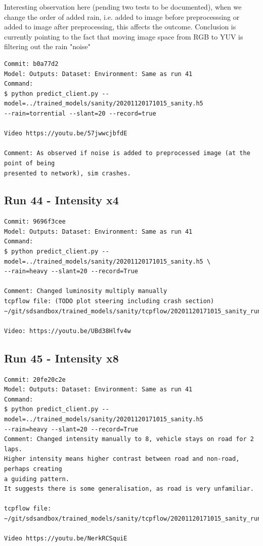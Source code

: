 Interesting observation here (pending two tests to be documented), when we change the order of added rain, i.e. added to image before preprocesssing or added to image after preprocessing, this affects the outcome. Conclusion is currently pointing to the fact that moving image space from RGB to YUV is filtering out the rain "noise"

\label{app_res:43}
\begin{verbatim}
Commit: b0a77d2
Model: Outputs: Dataset: Environment: Same as run 41 
Command: 
$ python predict_client.py --model=../trained_models/sanity/20201120171015_sanity.h5
--rain=torrential --slant=20 --record=true

Video https://youtu.be/57jwwcjbfdE

Comment: As observed if noise is added to preprocessed image (at the point of being
presented to network), sim crashes.

\end{verbatim}



\subsection{Run 44 - Intensity x4}
\begin{verbatim}
Commit: 9696f3cee
Model: Outputs: Dataset: Environment: Same as run 41 
Command: 
$ python predict_client.py --model=../trained_models/sanity/20201120171015_sanity.h5 \
--rain=heavy --slant=20 --record=True

Comment: Changed luminosity multiply manually 
tcpflow file: (TODO plot steering including crash section)
~/git/sdsandbox/trained_models/sanity/tcpflow/20201120171015_sanity_run44.log

Video: https://youtu.be/UBd38Hlfv4w

\end{verbatim}


\subsection{Run 45 - Intensity x8}
\begin{verbatim}
Commit: 20fe20c2e
Model: Outputs: Dataset: Environment: Same as run 41 
Command: 
$ python predict_client.py --model=../trained_models/sanity/20201120171015_sanity.h5
--rain=heavy --slant=20 --record=True
Comment: Changed intensity manually to 8, vehicle stays on road for 2 laps.
Higher intensity means higher contrast between road and non-road, perhaps creating 
a guiding pattern.
It suggests there is some generalisation, as road is very unfamiliar.

tcpflow file:
~/git/sdsandbox/trained_models/sanity/tcpflow/20201120171015_sanity_run45.log

Video https://youtu.be/NerkRCSquiE
\end{verbatim}


